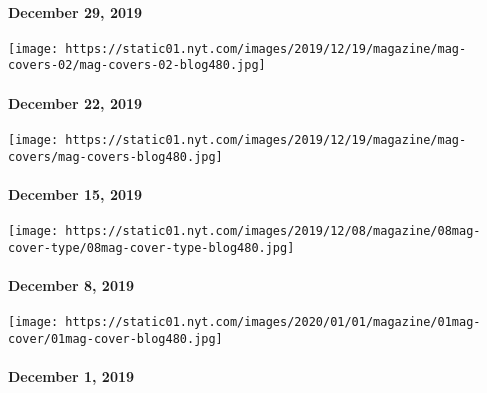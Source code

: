 \hypertarget{december-29-2019}{%
\paragraph{December 29, 2019}\label{december-29-2019}}

\href{https://www.nytimes.com/issue/magazine/2019/12/19/the-122219-issue}{}

\texttt{[image: https://static01.nyt.com/images/2019/12/19/magazine/mag-covers-02/mag-covers-02-blog480.jpg]}

\hypertarget{december-22-2019}{%
\paragraph{December 22, 2019}\label{december-22-2019}}

\href{https://www.nytimes.com/issue/magazine/2019/12/19/the-121519-issue}{}

\texttt{[image: https://static01.nyt.com/images/2019/12/19/magazine/mag-covers/mag-covers-blog480.jpg]}

\hypertarget{december-15-2019}{%
\paragraph{December 15, 2019}\label{december-15-2019}}

\href{https://www.nytimes.com/issue/magazine/2019/12/06/the-12819-issue}{}

\texttt{[image: https://static01.nyt.com/images/2019/12/08/magazine/08mag-cover-type/08mag-cover-type-blog480.jpg]}

\hypertarget{december-8-2019}{%
\paragraph{December 8, 2019}\label{december-8-2019}}

\href{https://www.nytimes.com/issue/magazine/2019/12/03/the-12119-issue}{}

\texttt{[image: https://static01.nyt.com/images/2020/01/01/magazine/01mag-cover/01mag-cover-blog480.jpg]}

\hypertarget{december-1-2019}{%
\paragraph{December 1, 2019}\label{december-1-2019}}

\href{https://www.nytimes.com/issue/magazine/2019/11/22/the-112419-issue}{}

